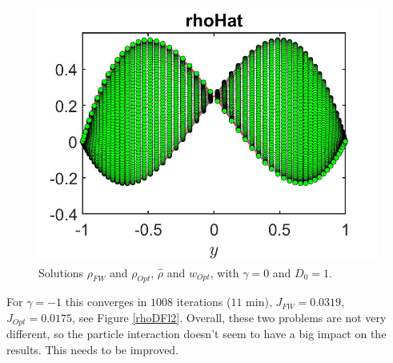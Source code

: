 \documentclass[11pt, a4paper]{article}
\theoremstyle{definition}
\begin{document}
\begin{figure}[h]
	\includegraphics[scale=0.3]{DFlrhoHat1.jpg}
	\caption{Solutions $\rho_{FW}$ and $\rho_{Opt}$, $\hat \rho$ and $w_{Opt}$, with $\gamma = 0$ and $D_0 = 1$.}
	\label{rhoDFl1}
\end{figure}
For $\gamma = -1$ this converges in $1008$ iterations ($11$ min), $J_{FW} = 0.0319$, $J_{Opt} = 0.0175$, see Figure \ref{rhoDFl2}. Overall, these two problems are not very different, so the particle interaction doesn't seem to have a big impact on the results. This needs to be improved.
\end{document}
